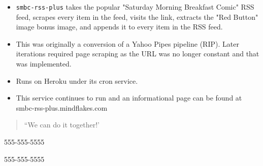 \documentclass[10pt,letter,ragged2e]{altacv}
\begin{document}
\begin{paracol}{2}
\divider


\begin{itemize}
\item \texttt{smbc-rss-plus} takes the popular "Saturday Morning Breakfast Comic" RSS feed, scrapes every item in the feed, visits the link, extracts the "Red Button" image bonus image, and appends it to every item in the RSS feed.
\item This was originally a conversion of a Yahoo Pipes pipeline (RIP). Later iterations required page scraping as the URL was no longer constant and that was implemented.
\item Runs on Heroku under its cron service.
\item This service continues to run and an informational page can be found at smbc-rss-plus.mindflakes.com
\end{itemize}

\newpage

\switchcolumn


\begin{quote}
``We can do it together!'
\end{quote}


   

  



\medskip





{555-555-5555}

\divider

{555-555-5555}

\divider


\end{paracol}
\end{document}
